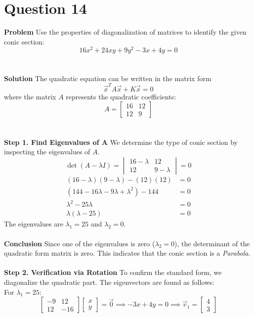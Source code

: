 \documentclass{article}
\begin{document}
\section{Question 14}
\textbf{Problem}
Use the properties of diagonalization of matrices to identify the given conic
section:
\[
	16x^{2} + 24xy + 9y^{2} - 3x + 4y = 0
\]
\\
\\
\textbf{Solution}
The quadratic equation can be written in the matrix form
\[
	\vec{x}^T A \vec{x} + K\vec{x} = 0
\]
where the matrix $A$ represents the quadratic coefficients:
\[
	A =
	\begin{bmatrix}
		16 & 12 \\
		12 & 9
	\end{bmatrix}
\]
\\
\\
\textbf{Step 1. Find Eigenvalues of A}
We determine the type of conic section by inspecting the eigenvalues of $A$.
\[
	\det(A - \lambda I) = \begin{vmatrix} 16 - \lambda & 12 \\ 12 & 9 - \lambda \end{vmatrix} = 0
\]
\begin{align*}
	(16 - \lambda)(9 - \lambda) - (12)(12)         & = 0 \\
	(144 - 16\lambda - 9\lambda + \lambda^2) - 144 & = 0 \\
	\lambda^2 - 25\lambda                          & = 0 \\
	\lambda(\lambda - 25)                          & = 0
\end{align*}
The eigenvalues are $\lambda_1 = 25$ and $\lambda_2 = 0$.
\\
\\
\textbf{Conclusion}
Since one of the eigenvalues is zero ($\lambda_2 = 0$), the determinant of the
quadratic form matrix is zero. This indicates that the conic section is a
\textit{Parabola}.
\\
\\
\textbf{Step 2. Verification via Rotation}
To confirm the standard form, we diagonalize the quadratic part. The
eigenvectors are found as follows:
\\
For $\lambda_1 = 25$:
\[
	\begin{bmatrix}
		-9 & 12  \\
		12 & -16
	\end{bmatrix}
	\begin{bmatrix}
		x \\
		y
	\end{bmatrix}
	= \vec{0} \implies -3x + 4y = 0 \implies \vec{v}_1
	=
	\begin{bmatrix}
		4 \\
		3
	\end{bmatrix}
\]
\end{document}
